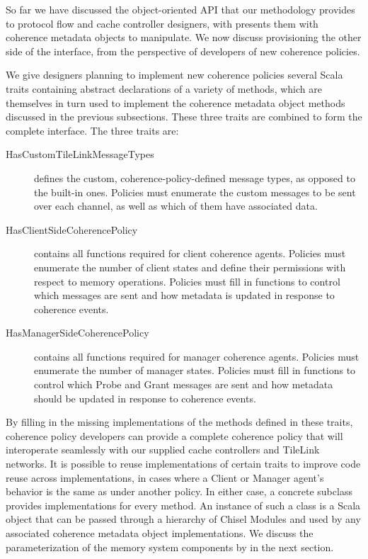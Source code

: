 So far we have discussed the object-oriented API that our methodology provides to
protocol flow and cache controller designers, with presents them with coherence metadata objects
to manipulate.
We now discuss provisioning the other side of the interface, from the perspective
of developers of new coherence policies.

We give designers planning to implement new coherence policies several Scala traits
containing abstract declarations of a variety of methods, which are themselves in turn
used to implement the coherence metadata object methods discussed in the previous subsections.
These three traits are combined to form the complete  interface.
The three traits are:
\begin{description}
\item[HasCustomTileLinkMessageTypes] defines the custom, coherence-policy-defined message types, as opposed to the built-in ones. Policies must enumerate the custom messages to be sent over each channel, as well as which of them have associated data.
\item[HasClientSideCoherencePolicy] contains all functions required for client coherence agents. Policies must enumerate the number of client states and define their permissions with respect to memory operations. Policies must fill in functions to control which messages are sent and how metadata is updated in response to coherence events.
\item[HasManagerSideCoherencePolicy] contains all functions required for manager coherence agents. Policies must enumerate the number of manager states. Policies must fill in functions to control which Probe and Grant messages are sent and how  metadata should be updated in response to coherence events.
\end{description}

By filling in the missing implementations of the methods defined in these traits, 
coherence policy developers can provide a complete coherence policy
that will interoperate seamlessly with our supplied cache controllers and TileLink networks.
It is possible to reuse implementations of certain traits to improve code reuse across  implementations,
in cases where a Client or Manager agent's behavior is the same as under another policy.
In either case, a concrete  subclass provides implementations for every method.
An instance of such a class is a Scala object that can be passed through a hierarchy of
Chisel Modules and used by any associated coherence metadata object implementations.
We discuss the parameterization of the memory system components by 
in the next section.

